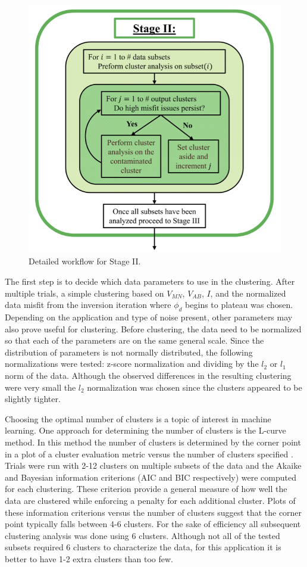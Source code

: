\documentclass[final,authoryear,5p,times,twocolumn]{elsarticle}
\begin{document}
\begin{figure} [!ht]
\begin{center}
   \includegraphics[trim=0cm 0cm 0cm 0cm, clip=true,width=0.75\linewidth]{./Figures/Fig11.png}
\end{center}
\caption{Detailed workflow for Stage II.}
\label{fig:DataQC_workflow_StageII}
\end{figure}

The first step is to decide which data parameters to use in the clustering. After multiple trials, a simple clustering based on $V_{MN}$, $V_{AB}$, $I$, and the normalized data misfit from the inversion iteration where $\phi_d$ begins to plateau was chosen. Depending on the application and type of noise present, other parameters may also prove useful for clustering. Before clustering, the data need to be normalized so that each of the parameters are on the same general scale. Since the distribution of parameters is not normally distributed, the following normalizations were tested: z-score normalization and dividing by the $l_{2}$ or $l_{1}$ norm of the data. Although the observed differences in the resulting clustering were very small the $l_{2}$ normalization was chosen since the clusters appeared to be slightly tighter.

Choosing the optimal number of clusters is a topic of interest in machine learning. One approach for determining the number of clusters is the L-curve method. In this method the number of clusters is determined by the corner point in a plot of a cluster evaluation metric versus the number of clusters specified \citep{Salvador2004}. Trials were run with 2-12 clusters on multiple subsets of the data and the Akaike and Bayesian information criterions (AIC and BIC respectively) were computed for each clustering. These criterion provide a general measure of how well the data are clustered while enforcing a penalty for each additional cluster. Plots of these information criterions versus the number of clusters suggest that the corner point typically falls between 4-6 clusters. For the sake of efficiency all subsequent clustering analysis was done using 6 clusters. Although not all of the tested subsets required 6 clusters to characterize the data, for this application it is better to have 1-2 extra clusters than too few.
\end{document}
